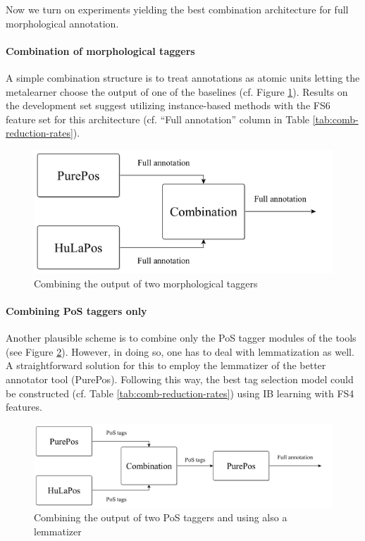 Now we turn on experiments yielding the best combination architecture for full morphological annotation.

\paragraph{Combination of morphological taggers}

A simple combination structure is to treat annotations as atomic units letting the metalearner choose the output of one of the baselines (cf. Figure \ref{fig:comb1}).
Results on the development set suggest utilizing instance-based methods with the FS6 feature set for this architecture (cf. ``Full annotation'' column in Table \ref{tab:comb-reduction-rates}). 

\begin{figure}[H]
  \centering
  \includegraphics[scale=0.2]{MorphTagging/comb1.png} 
  \caption{Combining the output of two morphological taggers}
  \label{fig:comb1}
\end{figure}

\paragraph{Combining PoS taggers only}

Another plausible scheme is to combine only the PoS tagger modules of the tools (see Figure \ref{fig:comb2}).
However, in doing so, one has to deal with lemmatization as well.
A straightforward solution for this to employ the lemmatizer of the better annotator tool (PurePos).
Following this way, the best tag selection model could be constructed (cf.
Table \ref{tab:comb-reduction-rates}) using IB learning with FS4 features.

\begin{figure}[H]
  \centering
  \includegraphics[scale=0.2]{MorphTagging/comb2.png} 
  \caption{Combining the output of two PoS taggers and using also a lemmatizer}
  \label{fig:comb2}
\end{figure}


